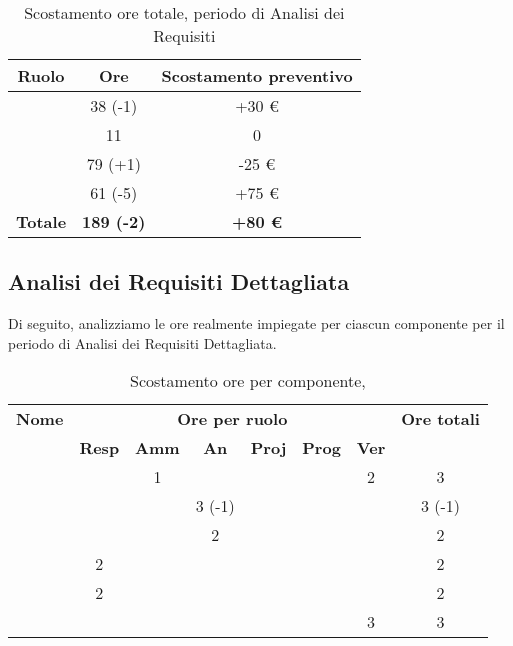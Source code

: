\begin{table}[H]
	\begin{center}
		\begin{tabular}{|c|c|c|}
			\hline
			\textbf{Ruolo}	& \textbf{Ore}	& \textbf{Scostamento preventivo} \\
			\hline
			\Res	&	38 (-1)	&  +30 € \\
			\hline
			\Amm	&	11	&  0 \\
			\hline
			\Ana	&	79 (+1)	&  -25 € \\
			\hline
			\Ver	&	61 (-5)	&  +75 €\\
			\hline
			\textbf{Totale} & \textbf{189 (-2)} & \textbf{+80 €}\\
			\hline
		\end{tabular}
	\end{center}
	\caption{Scostamento ore totale, periodo di Analisi dei Requisiti}
\end{table}

\subsection{Analisi dei Requisiti Dettagliata}

Di seguito, analizziamo le ore realmente impiegate per ciascun componente per il periodo di Analisi dei Requisiti Dettagliata.

\begin{table}[H]
	\begin{center}
		\begin{tabular}{|c|c|c|c|c|c|c|c|}
			\hline
			\textbf{Nome} & \multicolumn{6}{c|}{\textbf{Ore per ruolo}} & \textbf{Ore totali} \\\cline{2-7}
			& \textbf{Resp} & \textbf{Amm} & \textbf{An} & \textbf{Proj} & \textbf{Prog} & \textbf{Ver} & \\
			\hline
			\MC			&		&	1	&	 	&		&		&	2 	&	 3	\\
			\hline
			\AN			&		&		&	3 (-1) 	&	 	&		&	 	& 	 3 (-1)	\\
			\hline
			\DAN		&		&	 	&	2 	&		&		&		&	 2	\\
			\hline
			\AS			&	2	&	 	&	  	&		&	 	& 		&	 2	\\
			\hline
			\NS 		&	2	&		&	 	&		&		& 		&	 2	\\
			\hline
			\DS			& 		&	 	&	 	&		&		&	3 	&	 3	\\
			\hline
		\end{tabular}
	\end{center}
	\caption{Scostamento ore per componente, \ARD}
\end{table}

